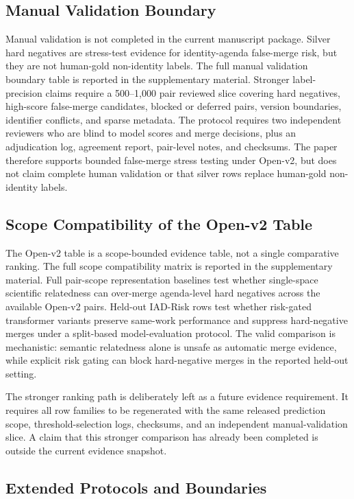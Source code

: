 \documentclass[11pt]{article}
\begin{document}
\subsection{Manual Validation Boundary}

Manual validation is not completed in the current manuscript package. Silver hard negatives are stress-test evidence for identity-agenda false-merge risk, but they are not human-gold non-identity labels. The full manual validation boundary table is reported in the supplementary material. Stronger label-precision claims require a 500--1,000 pair reviewed slice covering hard negatives, high-score false-merge candidates, blocked or deferred pairs, version boundaries, identifier conflicts, and sparse metadata. The protocol requires two independent reviewers who are blind to model scores and merge decisions, plus an adjudication log, agreement report, pair-level notes, and checksums. The paper therefore supports bounded false-merge stress testing under Open-v2, but does not claim complete human validation or that silver rows replace human-gold non-identity labels.

\subsection{Scope Compatibility of the Open-v2 Table}

The Open-v2 table is a scope-bounded evidence table, not a single comparative ranking. The full scope compatibility matrix is reported in the supplementary material. Full pair-scope representation baselines test whether single-space scientific relatedness can over-merge agenda-level hard negatives across the available Open-v2 pairs. Held-out IAD-Risk rows test whether risk-gated transformer variants preserve same-work performance and suppress hard-negative merges under a split-based model-evaluation protocol. The valid comparison is mechanistic: semantic relatedness alone is unsafe as automatic merge evidence, while explicit risk gating can block hard-negative merges in the reported held-out setting.

The stronger ranking path is deliberately left as a future evidence requirement. It requires all row families to be regenerated with the same released prediction scope, threshold-selection logs, checksums, and an independent manual-validation slice. A claim that this stronger comparison has already been completed is outside the current evidence snapshot.

\subsection{Extended Protocols and Boundaries}
\end{document}
